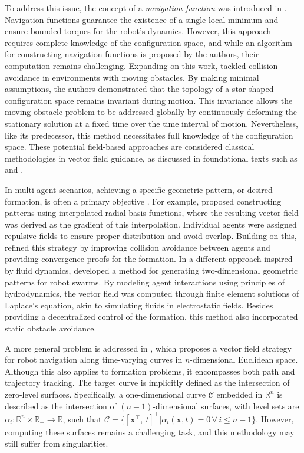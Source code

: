 To address this issue, the concept of a \emph{navigation function} was introduced in \citet{Rimon1992}. Navigation functions guarantee the existence of a single local minimum and ensure bounded torques for the robot's dynamics. However, this approach requires complete knowledge of the configuration space, and while an algorithm for constructing navigation functions is proposed by the authors, their computation remains challenging. Expanding on this work, \citet{Conn1998} tackled collision avoidance in environments with moving obstacles. By making minimal assumptions, the authors demonstrated that the topology of a star-shaped configuration space remains invariant during motion. This invariance allows the moving obstacle problem to be addressed globally by continuously deforming the stationary solution at a fixed time over the time interval of motion. Nevertheless, like its predecessor, this method necessitates full knowledge of the configuration space. These potential field-based approaches are considered classical methodologies in vector field guidance, as discussed in foundational texts such as \citet[p.77]{Choset2005} and \citet[p.299]{Spong2020}.

In multi-agent scenarios, achieving a specific geometric pattern, or desired formation, is often a primary objective \citep{Chaimowicz2005,Mong-yingA.Hsieh2006,Pimenta2007}. For example, \citet{Chaimowicz2005} proposed constructing patterns using interpolated radial basis functions, where the resulting vector field was derived as the gradient of this interpolation. Individual agents were assigned repulsive fields to ensure proper distribution and avoid overlap. Building on this, \citet{Mong-yingA.Hsieh2006} refined this strategy by improving collision avoidance between agents and providing convergence proofs for the formation. In a different approach inspired by fluid dynamics, \citet{Pimenta2007} developed a method for generating two-dimensional geometric patterns for robot swarms. By modeling agent interactions using principles of hydrodynamics, the vector field was computed through finite element solutions of Laplace's equation, akin to simulating fluids in electrostatic fields. Besides providing a decentralized control of the formation, this method also incorporated static obstacle avoidance.

A more general problem is addressed in \citet{goncalves2010vectorfield}, which proposes a vector field strategy for robot navigation along time-varying curves in $n$-dimensional Euclidean space. Although this also applies to formation problems, it encompasses both path and trajectory tracking. The target curve is implicitly defined as the intersection of zero-level surfaces. Specifically, a one-dimensional curve $\mathcal{C}$ embedded in $\mathbb{R}^n$ is described as the intersection of $(n-1)$-dimensional surfaces, with level sets are $\alpha_i:\mathbb{R}^n\times\mathbb{R}_+\to\mathbb{R}$, such that $\mathcal{C} = \{ [ \mathbf{x}^\top,\ t]^\top | \alpha_i(\mathbf{x}, t) = 0\,\forall\,i\le n-1 \}$. However, computing these surfaces remains a challenging task, and this methodology may still suffer from singularities.

